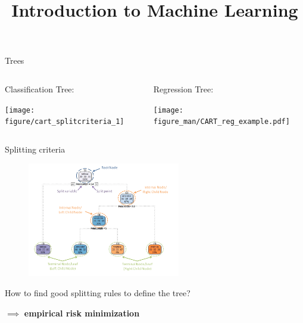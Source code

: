 \documentclass[11pt,compress,t,notes=noshow, xcolor=table]{beamer}
\title{Introduction to Machine Learning}
\institute{\href{https://compstat-lmu.github.io/lecture_i2ml/}{compstat-lmu.github.io/lecture\_i2ml}}
\date{}
\begin{document}
\sloppy

\begin{frame}[fragile]{Trees}

\lz 

\begin{columns}
\begin{column}{0.5\textwidth}
Classification Tree:
\lz


\begin{knitrout}\scriptsize
{}\color{fgcolor}

{\centering \texttt{[image: figure/cart\_splitcriteria\_1]} 

}



\end{knitrout}
 
\end{column}
\begin{column}{0.5\textwidth}
Regression Tree:

\texttt{[image: figure\_man/CART\_reg\_example.pdf]}

\end{column}
\end{columns}
\end{frame}

\begin{frame}{Splitting criteria}

 \begin{figure}
    \centering
      \includegraphics[height = 5.0cm]{figure_man/labelling_of_tree.png}
    \end{figure}

How to find good splitting rules to define the tree?
\lz

$\implies$ \textbf{empirical risk minimization}

\end{frame}
\end{document}
